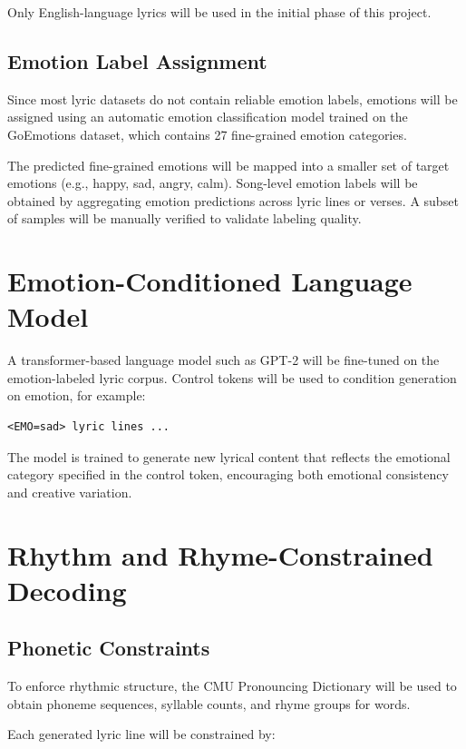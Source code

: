 \documentclass[11pt]{article}
\begin{document}
Only English-language lyrics will be used in the initial phase of this project.

\subsection{Emotion Label Assignment}

Since most lyric datasets do not contain reliable emotion labels, emotions will be assigned using an automatic emotion classification model trained on the GoEmotions dataset, which contains 27 fine-grained emotion categories.

The predicted fine-grained emotions will be mapped into a smaller set of target emotions (e.g., happy, sad, angry, calm). Song-level emotion labels will be obtained by aggregating emotion predictions across lyric lines or verses. A subset of samples will be manually verified to validate labeling quality.

\section{Emotion-Conditioned Language Model}

A transformer-based language model such as GPT-2 will be fine-tuned on the emotion-labeled lyric corpus. Control tokens will be used to condition generation on emotion, for example:

\begin{verbatim}
<EMO=sad> lyric lines ...
\end{verbatim}

The model is trained to generate new lyrical content that reflects the emotional category specified in the control token, encouraging both emotional consistency and creative variation.

\section{Rhythm and Rhyme-Constrained Decoding}

\subsection{Phonetic Constraints}

To enforce rhythmic structure, the CMU Pronouncing Dictionary will be used to obtain phoneme sequences, syllable counts, and rhyme groups for words.

Each generated lyric line will be constrained by:
\end{document}
